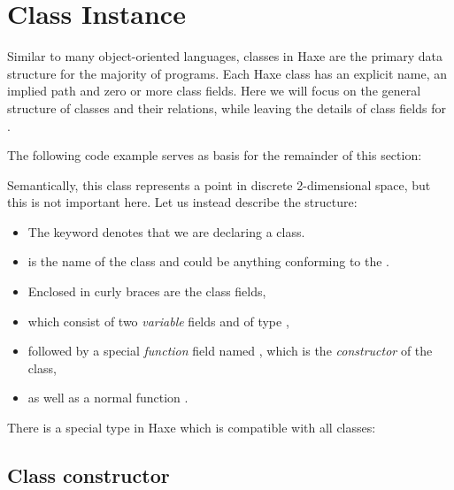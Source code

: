 \documentclass{haxe}
\begin{document}
\section{Class Instance}
\label{types-class-instance}

Similar to many object-oriented languages, classes in Haxe are the primary data structure for the majority of programs. Each Haxe class has an explicit name, an implied path and zero or more class fields. Here we will focus on the general structure of classes and their relations, while leaving the details of class fields for .

The following code example serves as basis for the remainder of this section:


Semantically, this class represents a point in discrete 2-dimensional space, but this is not important here. Let us instead describe the structure:

\begin{itemize}
	\item The keyword  denotes that we are declaring a class.
	\item {} is the name of the class and could be anything conforming to the .
	\item Enclosed in curly braces \expr{$\left\{\right\}$} are the class fields,
	\item which consist of two \emph{variable} fields  and  of type ,
	\item followed by a special \emph{function} field named , which is the \emph{constructor} of the class,
	\item as well as a normal function .
\end{itemize}
There is a special type in Haxe which is compatible with all classes:


\subsection{Class constructor}
\label{types-class-constructor}
\end{document}
